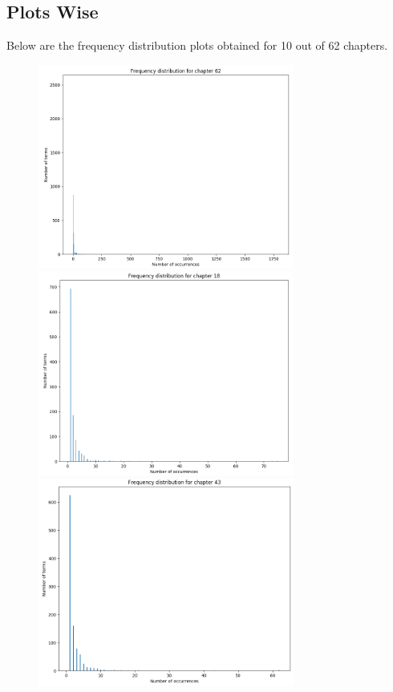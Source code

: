 \documentclass{article}
\begin{document}
\subsection{Plots Wise}
\begin{flushleft}
	Below are the frequency distribution plots obtained for 10 out of 62 chapters. 
	\begin{figure}[H]
		\begin{minipage}{0.45\linewidth}
			\centering
			\includegraphics[width=0.75\textwidth]{./images/1-chapter_wise-frequency.png}
			\includegraphics[width=0.75\textwidth]{./images/2-chapter_wise-frequency.png}
			\includegraphics[width=0.75\textwidth]{./images/3-chapter_wise-frequency.png}

\end{minipage}
\end{figure}
\end{flushleft}
\end{document}
